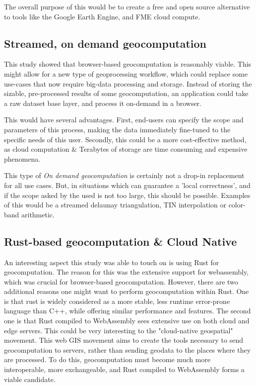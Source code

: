 The overall purpose of this would be to create a free and open source alternative to tools like the Google Earth Engine, and FME cloud compute. 

\subsection{Streamed, on demand geocomputation}

This study showed that browser-based geocomputation is reasonably viable. 
This might allow for a new type of geoprocessing workflow, which could replace some use-cases that now require big-data processing and storage.
Instead of storing the sizable, pre-processed results of some geocomputation, an application could take a raw dataset base layer, and process it on-demand in a browser.

This would have several advantages. 
First, end-users can specify the scope and parameters of this process, making the data immediately fine-tuned to the specific needs of this user. 
Secondly, this could be a more cost-effective method, as cloud computation \& Terabytes of storage are time consuming and expensive phenomena.

This type of \emph{On demand geocomputation} is certainly not a drop-in replacement for all use cases. 
But, in situations which can guarantee a 'local correctness', and if the scope asked by the used is not too large, this should be possible. 
Examples of this would be a streamed delaunay triangulation, TIN interpolation or color-band arithmetic. 

\subsection{Rust-based geocomputation \& Cloud Native}
An interesting aspect this study was able to touch on is using Rust for geocomputation.
The reason for this was the extensive support for webassembly, which was crucial for browser-based geocomputation. 
However, there are two additional reasons one might want to perform geocomputation within Rust.
One is that rust is widely considered as a more stable, less runtime error-prone language than C++, while offering similar performance and features. 
The second one is that Rust compiled to WebAssembly sees extensive use on both cloud and edge servers.  
This could be very interesting to the "cloud-native geospatial" movement. 
This web GIS movement aims to create the tools necessary to send geocomputation to servers, rather than sending geodata to the places where they are processed.
To do this, geocomputation must become much more interoperable, more exchangeable, and Rust compiled to WebAssembly forms a viable candidate. 

